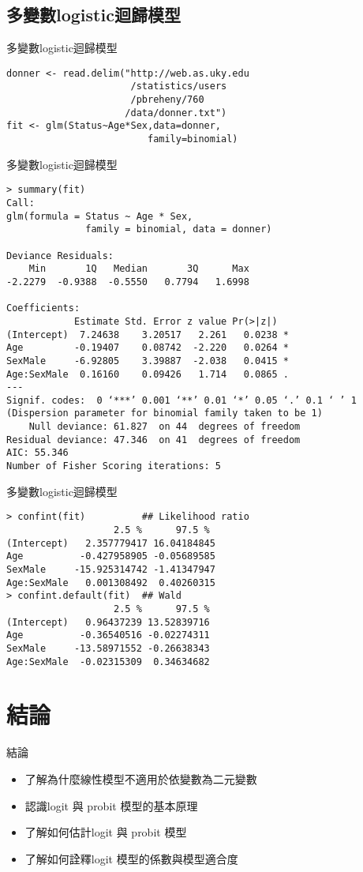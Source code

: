 \documentclass[border=10pt]{beamer}
\begin{document}
\subsection{多變數logistic迴歸模型}
\begin{frame}[fragile=singleslide]{多變數logistic迴歸模型}
\small
\begin{Verbatim}[label=\textit{R code}, formatcom=\color{yellow}, frame=single]
donner <- read.delim("http://web.as.uky.edu
                      /statistics/users
                      /pbreheny/760
                     /data/donner.txt")
fit <- glm(Status~Age*Sex,data=donner,
                         family=binomial)
\end{Verbatim}
\end{frame}
\begin{frame}[fragile=singleslide]{多變數logistic迴歸模型}
\small
\begin{Verbatim}[label=\textit{R output}, formatcom=\color{yellow}, frame=single]
> summary(fit)
Call:
glm(formula = Status ~ Age * Sex, 
              family = binomial, data = donner)

Deviance Residuals: 
    Min       1Q   Median       3Q      Max  
-2.2279  -0.9388  -0.5550   0.7794   1.6998  

Coefficients:
            Estimate Std. Error z value Pr(>|z|)  
(Intercept)  7.24638    3.20517   2.261   0.0238 *
Age         -0.19407    0.08742  -2.220   0.0264 *
SexMale     -6.92805    3.39887  -2.038   0.0415 *
Age:SexMale  0.16160    0.09426   1.714   0.0865 .
---
Signif. codes:  0 ‘***’ 0.001 ‘**’ 0.01 ‘*’ 0.05 ‘.’ 0.1 ‘ ’ 1
(Dispersion parameter for binomial family taken to be 1)
    Null deviance: 61.827  on 44  degrees of freedom
Residual deviance: 47.346  on 41  degrees of freedom
AIC: 55.346
Number of Fisher Scoring iterations: 5
\end{Verbatim}
\end{frame}

\begin{frame}[fragile=singleslide]{多變數logistic迴歸模型}
\small
\begin{Verbatim}[label=\textit{R output}, formatcom=\color{yellow}, frame=single]
> confint(fit)          ## Likelihood ratio
                   2.5 %      97.5 %
(Intercept)   2.357779417 16.04184845
Age          -0.427958905 -0.05689585
SexMale     -15.925314742 -1.41347947
Age:SexMale   0.001308492  0.40260315
> confint.default(fit)  ## Wald
                   2.5 %      97.5 %
(Intercept)   0.96437239 13.52839716
Age          -0.36540516 -0.02274311
SexMale     -13.58971552 -0.26638343
Age:SexMale  -0.02315309  0.34634682
\end{Verbatim}
\end{frame}
\section{結論}
\begin{frame}{結論}
\normalsize
\begin{itemize}
\item 了解為什麼線性模型不適用於依變數為二元變數
\item 認識logit 與 probit 模型的基本原理
\item 了解如何估計logit 與 probit 模型
\item 了解如何詮釋logit  模型的係數與模型適合度
\end{itemize}
\end{frame}
\end{document}
